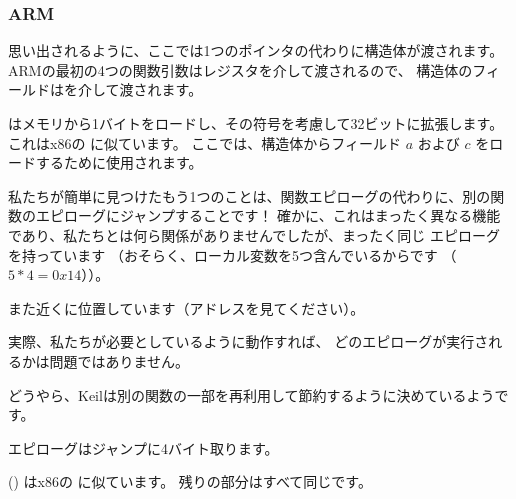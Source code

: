 ﻿\subsubsection{ARM}

\myparagraph{\OptimizingKeilVI (\ThumbMode)}



思い出されるように、ここでは1つのポインタの代わりに構造体が渡されます。
ARMの最初の4つの関数引数はレジスタを介して渡されるので、
構造体のフィールドはを介して渡されます。

はメモリから1バイトをロードし、その符号を考慮して32ビットに拡張します。 
これはx86の \MOVSX に似ています。 
ここでは、構造体からフィールド $a$ および $c$ をロードするために使用されます。


私たちが簡単に見つけたもう1つのことは、関数エピローグの代わりに、別の関数のエピローグにジャンプすることです！ 
確かに、これはまったく異なる機能であり、私たちとは何ら関係がありませんでしたが、まったく同じ
エピローグを持っています
（おそらく、ローカル変数を5つ含んでいるからです
（$5*4=0x14$））。

また近くに位置しています（アドレスを見てください）。

実際、私たちが必要としているように動作すれば、
どのエピローグが実行されるかは問題ではありません。

どうやら、Keilは別の関数の一部を再利用して節約するように決めているようです。

エピローグはジャンプに4バイト取ります。




 () はx86の \MOVSX に似ています。
残りの部分はすべて同じです。
